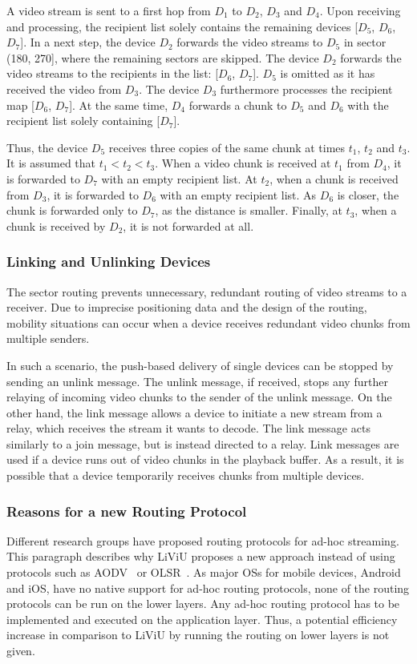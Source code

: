 A video stream is sent to a first hop from $D_1$ to $D_2$, $D_3$ and $D_4$.
Upon receiving and processing, the recipient list solely contains the remaining devices [$D_5$, $D_6$, $D_7$].
In a next step, the device $D_2$ forwards the video streams to $D_5$ in sector (180\degree, 270\degree], where the remaining sectors are skipped. 
The device $D_2$ forwards the video streams to the recipients in the list: [$D_6$, $D_7$]. 
$D_5$ is omitted as it has received the video from $D_3$.
The device $D_3$ furthermore processes the recipient map [$D_6$, $D_7$]. 
At the same time, $D_4$ forwards a chunk to $D_5$ and $D_6$ with the recipient list solely containing [$D_7$]. 

Thus, the device $D_5$ receives three copies of the same chunk at times $t_1$, $t_2$ and $t_3$. 
It is assumed that $t_1 < t_2 < t_3$. 
When a video chunk is received at $t_1$ from $D_4$, it is forwarded to $D_7$ with an empty recipient list. 
At $t_2$, when a chunk is received from $D_3$, it is forwarded to $D_6$ with an empty recipient list. 
As $D_6$ is closer, the chunk is forwarded only to $D_7$, as the distance is smaller. 
Finally, at $t_3$, when a chunk is received by $D_2$, it is not forwarded at all. 
\subsubsection{Linking and Unlinking Devices}
\label{sec:534_unlinking}
The sector routing prevents unnecessary, redundant routing of video streams to a receiver. 
Due to imprecise positioning data and the design of the routing, mobility situations can occur when a device receives redundant video chunks from multiple senders.

In such a scenario, the push-based delivery of single devices can be stopped by sending an unlink message. 
The unlink message, if received, stops any further relaying of incoming video chunks to the sender of the unlink message.
On the other hand, the link message allows a device to initiate a new stream from a relay, which receives the stream it wants to decode.
The link message acts similarly to a join message, but is instead directed to a relay.
Link messages are used if a device runs out of video chunks in the playback buffer.
As a result, it is possible that a device temporarily receives chunks from multiple devices.
\subsubsection{Reasons for a new Routing Protocol}
Different research groups have proposed routing protocols for ad-hoc streaming.
This paragraph describes why \ac{LiViU} proposes a new approach instead of using protocols such as \ac{AODV}~\cite{aodv} or \ac{OLSR}~\cite{olsr}.
As major \acp{OS} for mobile devices, Android and iOS, have no native support for ad-hoc routing protocols, none of the routing protocols can be run on the lower layers.
Any ad-hoc routing protocol has to be implemented and executed on the application layer.
Thus, a potential efficiency increase in comparison to \ac{LiViU} by running the routing on lower layers is not given.

